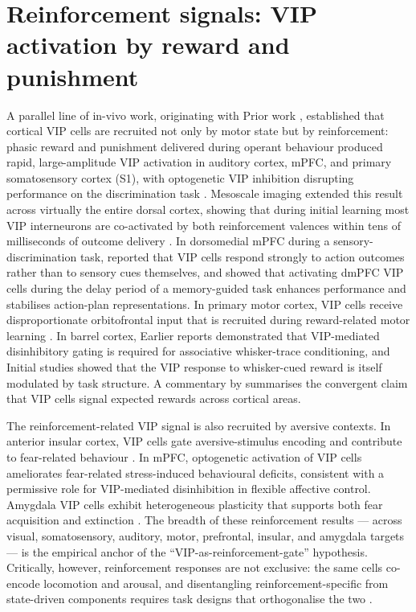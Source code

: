 \documentclass[11pt]{article}
\begin{document}
\section{Reinforcement signals: VIP activation by reward and punishment}

A parallel line of in-vivo work, originating with Prior work \citep{Pi2013}, established that cortical VIP cells are recruited not only by motor state but by reinforcement: phasic reward and punishment delivered during operant behaviour produced rapid, large-amplitude VIP activation in auditory cortex, mPFC, and primary somatosensory cortex (S1), with optogenetic VIP inhibition disrupting performance on the discrimination task \citep{Pi2013}. Mesoscale imaging extended this result across virtually the entire dorsal cortex, showing that during initial learning most VIP interneurons are co-activated by both reinforcement valences within tens of milliseconds of outcome delivery \citep{Szadai2022}. In dorsomedial mPFC during a sensory-discrimination task, \citet{Pinto2015} reported that VIP cells respond strongly to action outcomes rather than to sensory cues themselves, and \citet{Kamigaki2017} showed that activating dmPFC VIP cells during the delay period of a memory-guided task enhances performance and stabilises action-plan representations. In primary motor cortex, VIP cells receive disproportionate orbitofrontal input that is recruited during reward-related motor learning \citep{Lee2023b}. In barrel cortex, Earlier reports \citep{Krabbe2019} demonstrated that VIP-mediated disinhibitory gating is required for associative whisker-trace conditioning, and Initial studies \citep{Sachidhanandam2016} showed that the VIP response to whisker-cued reward is itself modulated by task structure. A commentary by \citet{Zou2023} summarises the convergent claim that VIP cells signal expected rewards across cortical areas.

The reinforcement-related VIP signal is also recruited by aversive contexts. In anterior insular cortex, VIP cells gate aversive-stimulus encoding and contribute to fear-related behaviour \citep{Ramosprats2022}. In mPFC, optogenetic activation of VIP cells ameliorates fear-related stress-induced behavioural deficits, consistent with a permissive role for VIP-mediated disinhibition in flexible affective control. Amygdala VIP cells exhibit heterogeneous plasticity that supports both fear acquisition and extinction \citep{Favila2025}. The breadth of these reinforcement results --- across visual, somatosensory, auditory, motor, prefrontal, insular, and amygdala targets --- is the empirical anchor of the ``VIP-as-reinforcement-gate'' hypothesis. Critically, however, reinforcement responses are not exclusive: the same cells co-encode locomotion and arousal, and disentangling reinforcement-specific from state-driven components requires task designs that orthogonalise the two \citep{Pinto2015, Szadai2022, Garciajuncoclemente2017}.
\end{document}
